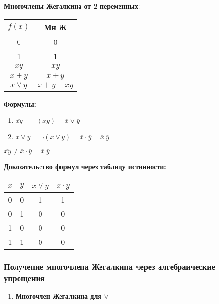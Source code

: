 \documentclass[russian]{lecture-notes}
\begin{document}
\begin{sloppypar}
\textbf{Многочлены Жегалкина от 2 переменных:}

\begin{table}[h!]
	\centering
	\begin{tabular}{|c|c|}
		\hline
		$f(x)$ & Мн Ж  \\ \hline
		0    		   & 0     \\ \hline
		1    		   & 1     \\ \hline
		$xy$          & $xy$     \\ \hline
		$x + y$ & $x + y$ \\ \hline
		$x \lor y$ & $x + y + xy$ \\ \hline
	\end{tabular}
\end{table}

\textbf{Формулы:}

\begin{enumerate}
	\item 	$\overline{xy} = \neg (xy) = \overline{x} \lor \overline{y} $
	\item $\overline{x \lor y} = \neg (x \lor y) = \overline{x} \cdot \overline{y} = \overline{x} \: \overline{y}$
\end{enumerate}

\begin{remark}
	$\overline{xy} \neq \overline{x} \cdot \overline{y} = \overline{x} \: \overline{y}$
\end{remark}

\textbf{Докозательство формул через таблицу истинности:}

\begin{table}[h!]
	\centering	
	\begin{tabular}{|c|c|c|c|}
		\hline
		$x$ & $y$ & $\overline{x \lor y}$ & $\overline{x} \cdot \overline{y}$ \\ \hline
		0 & 0 & 1   & 1   \\ \hline
		0 & 1 & 0   & 0   \\ \hline
		1 & 0 & 0   & 0   \\ \hline
		1 & 1 & 0   & 0   \\ \hline
\end{tabular}
\end{table}

\subsubsection{Получение многочлена Жегалкина через алгебраические упрощения}

\begin{enumerate}
	\item{
		\textbf{Многочлен Жегалкина для $\lor$}

}
\end{enumerate}
\end{sloppypar}
\end{document}
